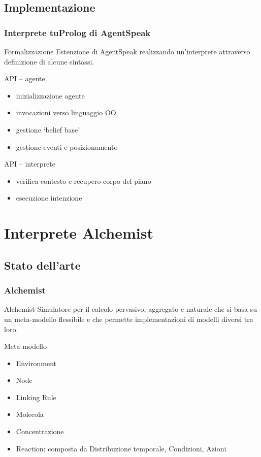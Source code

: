 \documentclass[handout]{beamer}\mode<presentation>{\usetheme{AMSCesenaBleu}}
\begin{document}
\subsection{Implementazione}
\begin{frame}
\frametitle{Interprete tuProlog di AgentSpeak}
\begin{block}{Formalizzazione}
Estenzione di AgentSpeak realizzando un'interprete attraverso definizione di alcune sintassi.
\end{block}

\begin{block}{API -- agente}
\begin{itemize}
\item inizializzazione agente
\item invocazioni verso linguaggio OO
\item gestione `belief base'
\item gestione eventi e posizionamento
\end{itemize}
\end{block}

\begin{block}{API -- interprete}
\begin{itemize}
\item verifica contesto e recupero corpo del piano
\item esecuzione intenzione
\end{itemize}
\end{block}
\end{frame}



\section{Interprete Alchemist}

\subsection{Stato dell'arte}
\begin{frame}
\frametitle{Alchemist}
\begin{block}{Alchemist}
Simulatore per il calcolo pervasivo, aggregato e naturale che si basa su un meta-modello flessibile e che permette implementazioni di modelli diversi tra loro.
\end{block}
\begin{block}{Meta-modello}
\begin{itemize}
\item Environment
\item Node
\item Linking Rule
\item Molecola
\item Concentrazione
\item Reaction: composta da Distribuzione temporale, Condizioni, Azioni
\end{itemize}
\end{block}
\end{frame}
\end{document}
